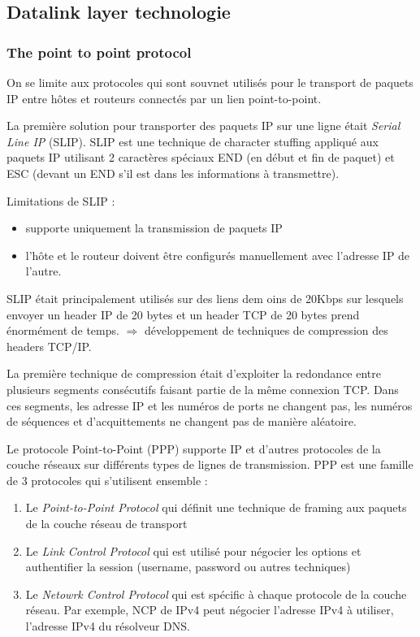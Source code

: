 \subsection{Datalink layer technologie}

\subsubsection{The point to point protocol}
	On se limite aux protocoles qui sont souvnet utilisés pour le transport de paquets IP entre hôtes et routeurs connectés par un lien point-to-point.
	
	La première solution pour transporter des paquets IP sur une ligne était \textit{Serial Line IP} (SLIP). SLIP est une technique de character stuffing appliqué aux paquets IP utilisant 2 caractères spéciaux END (en début et fin de paquet) et ESC (devant un END s'il est dans les informations à transmettre). \bigskip
	
	Limitations de SLIP :
	\begin{itemize}
	 \item supporte uniquement la transmission de paquets IP
	 \item l'hôte et le routeur doivent être configurés manuellement avec l'adresse IP de l'autre.
	\end{itemize}
	
	SLIP était principalement utilisés sur des liens dem oins de 20Kbps sur lesquels envoyer un header IP de 20 bytes et un header TCP de 20 bytes prend énormément de temps. $\Rightarrow$ développement de techniques de compression des headers TCP/IP.
	
	La première technique de compression était d'exploiter la redondance entre plusieurs segments consécutifs faisant partie de la même connexion TCP. Dans ces segments, les adresse IP et les numéros de ports ne changent pas, les numéros de séquences et d'acquittements ne changent pas de manière aléatoire.
	
	Le protocole Point-to-Point (PPP) supporte IP et d'autres protocoles de la couche réseaux sur différents types de lignes de transmission. PPP est une famille de 3 protocoles qui s'utilisent ensemble :
	
	\begin{enumerate}
	 \item Le \textit{Point-to-Point Protocol} qui définit une technique de framing aux paquets de la couche réseau de transport
	 \item Le \textit{Link Control Protocol} qui est utilisé pour négocier les options et authentifier la session (username, password ou autres techniques)
	 \item Le \textit{Netowrk Control Protocol} qui est spécific à chaque protocole de la couche réseau. Par exemple, NCP de IPv4 peut négocier l'adresse IPv4 à utiliser, l'adresse IPv4 du résolveur DNS.
	\end{enumerate}
	
